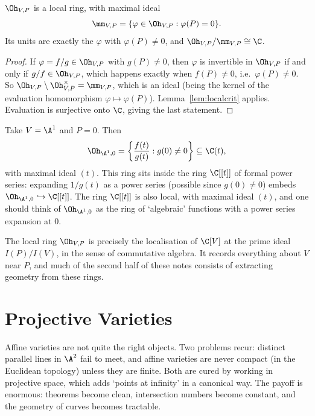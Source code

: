 \begin{proposition}
	$\Oh_{V,P}$ is a local ring, with maximal ideal
	$$\mm_{V,P} = \{\varphi \in \Oh_{V,P} : \varphi(P) = 0\}.$$
	Its units are exactly the $\varphi$ with $\varphi(P) \neq 0$, and $\Oh_{V,P}/\mm_{V,P} \cong \C$.
\end{proposition}

\begin{proof}
	If $\varphi = f/g \in \Oh_{V,P}$ with $g(P) \neq 0$, then $\varphi$ is invertible in $\Oh_{V,P}$ if and only if $g/f \in \Oh_{V,P}$, which happens exactly when $f(P) \neq 0$, i.e.\ $\varphi(P) \neq 0$. So $\Oh_{V,P}\setminus \Oh_{V,P}^\times = \mm_{V,P}$, which is an ideal (being the kernel of the evaluation homomorphism $\varphi \mapsto \varphi(P)$). Lemma~\ref{lem:localcrit} applies. Evaluation is surjective onto $\C$, giving the last statement.
\end{proof}

\begin{example}
	Take $V = \A^1$ and $P = 0$. Then
	$$\Oh_{\A^1,0} = \left\{ \frac{f(t)}{g(t)} : g(0) \neq 0 \right\} \subseteq \C(t),$$
	with maximal ideal $(t)$. This ring sits inside the ring $\C[[t]]$ of formal power series: expanding $1/g(t)$ as a power series (possible since $g(0) \neq 0$) embeds $\Oh_{\A^1,0} \hookrightarrow \C[[t]]$. The ring $\C[[t]]$ is also local, with maximal ideal $(t)$, and one should think of $\Oh_{\A^1,0}$ as the ring of `algebraic' functions with a power series expansion at $0$.
\end{example}

The local ring $\Oh_{V,P}$ is precisely the localisation of $\C[V]$ at the prime ideal $I(P)/I(V)$, in the sense of commutative algebra. It records everything about $V$ near $P$, and much of the second half of these notes consists of extracting geometry from these rings.

\section{Projective Varieties}

Affine varieties are not quite the right objects. Two problems recur: distinct parallel lines in $\A^2$ fail to meet, and affine varieties are never compact (in the Euclidean topology) unless they are finite. Both are cured by working in projective space, which adds `points at infinity' in a canonical way. The payoff is enormous: theorems become clean, intersection numbers become constant, and the geometry of curves becomes tractable.


